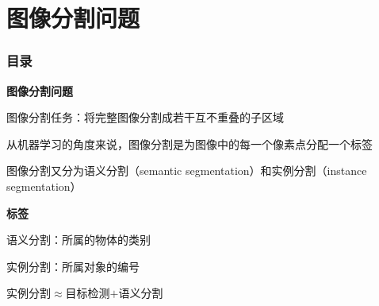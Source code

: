 \section{图像分割问题}
\begin{frame}[allowframebreaks]
  \frametitle{\textsc{目录}} \vspace{-0.3cm}
    \begin{spacing}{0.0}
    \end{spacing}   %
\end{frame}



\begin{frame}
    \noindent\large\textbf{图像分割问题}

    \vspace{1em}
    图像分割任务：将完整图像分割成若干互不重叠的子区域

    \vspace{0.1em}
    从机器学习的角度来说，图像分割是为图像中的每一个像素点分配一个标签

    \vspace{0.1em}
    图像分割又分为语义分割（semantic segmentation）和实例分割（instance segmentation）
    \begin{figure}
    \end{figure}
\end{frame}

\begin{frame}
    \noindent\large\textbf{标签}

    \vspace{0.1em}
    语义分割：所属的物体的类别

    \vspace{0.1em}
    实例分割：所属对象的编号

    \begin{figure}
    \end{figure}

    实例分割$\approx $目标检测$+$语义分割
\end{frame}

